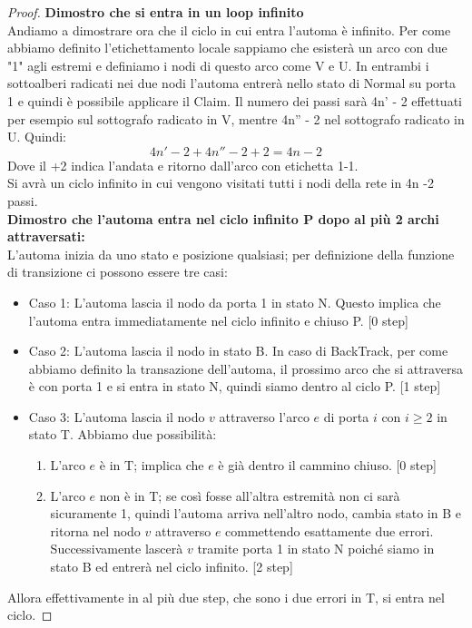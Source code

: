 \begin{proof}
    \textbf{Dimostro che si entra in un loop infinito}\\
    Andiamo a dimostrare ora che il ciclo in cui entra l'automa è infinito. Per
    come abbiamo definito l'etichettamento locale sappiamo che esisterà un arco
    con due "1" agli estremi e definiamo i nodi di questo arco come V e U. In
    entrambi i sottoalberi radicati nei due nodi l'automa entrerà nello stato di
    Normal su porta 1 e quindi è possibile applicare il Claim. Il numero dei passi
    sarà 4n' - 2 effettuati per esempio sul sottografo radicato in V, mentre 4n''
    - 2 nel sottografo radicato in U. Quindi: \\
    $$4n'-2 + 4n''-2 + 2 = 4n -2$$ Dove il +2 indica l'andata e ritorno dall'arco
    con etichetta 1-1.\\
    Si avrà un ciclo infinito in cui vengono visitati tutti i nodi della rete in
    4n -2 passi.\\
    \textbf{Dimostro che l'automa entra nel ciclo infinito P dopo al più 2 archi
        attraversati:}\\
    L'automa inizia da uno stato e posizione qualsiasi; per definizione della
    funzione di transizione ci possono essere tre casi:
    \begin{itemize}
        \item Caso 1: L'automa lascia il nodo da porta 1 in stato N. Questo
              implica che l'automa entra immediatamente nel ciclo infinito e
              chiuso P. [0 step]
        \item Caso 2: L'automa lascia il nodo in stato B. In caso di BackTrack,
              per come abbiamo definito la transazione dell'automa, il prossimo
              arco che si attraversa è con porta 1 e si entra in stato N, quindi
              siamo dentro al ciclo P. [1 step]
        \item Caso 3: L'automa lascia il nodo $v$ attraverso l'arco $e$ di porta
              $i$ con $i\geq2$ in stato T. Abbiamo due possibilità:
              \begin{enumerate}
                  \item L'arco $e$ è in T; implica che $e$ è già dentro il
                        cammino chiuso. [0 step]
                  \item L'arco $e$ non è in T; se così fosse all'altra estremità
                        non ci sarà sicuramente 1, quindi l'automa arriva
                        nell'altro nodo, cambia stato in B e ritorna nel nodo
                        $v$ attraverso $e$ commettendo esattamente due errori.
                        Successivamente lascerà $v$ tramite porta 1 in stato N
                        poiché siamo in stato B ed entrerà nel ciclo infinito.
                            [2 step]
              \end{enumerate}
    \end{itemize}
    Allora effettivamente in al più due step, che sono i due errori in T, si entra
    nel ciclo.
\end{proof}

